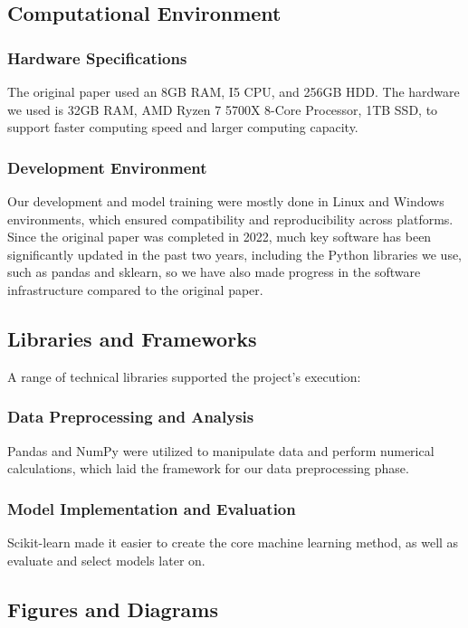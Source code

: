 \documentclass[conference]{IEEEtran}
\begin{document}
\subsection{Computational Environment}

\subsubsection{Hardware Specifications}
The original paper used an 8GB RAM, I5 CPU, and 256GB HDD. The hardware we used is 32GB RAM, AMD Ryzen 7 5700X 8-Core Processor, 1TB SSD, to support faster computing speed and larger computing capacity.

\subsubsection{Development Environment}
Our development and model training were mostly done in Linux and Windows environments, which ensured compatibility and reproducibility across platforms. Since the original paper was completed in 2022, much key software has been significantly updated in the past two years, including the Python libraries we use, such as pandas and sklearn, so we have also made progress in the software infrastructure compared to the original paper.

\subsection{Libraries and Frameworks}

A range of technical libraries supported the project's execution:

\subsubsection{Data Preprocessing and Analysis}
Pandas and NumPy were utilized to manipulate data and perform numerical calculations, which laid the framework for our data preprocessing phase.

\subsubsection{Model Implementation and Evaluation}
Scikit-learn made it easier to create the core machine learning method, as well as evaluate and select models later on.

\subsection{Figures and Diagrams}
\end{document}
